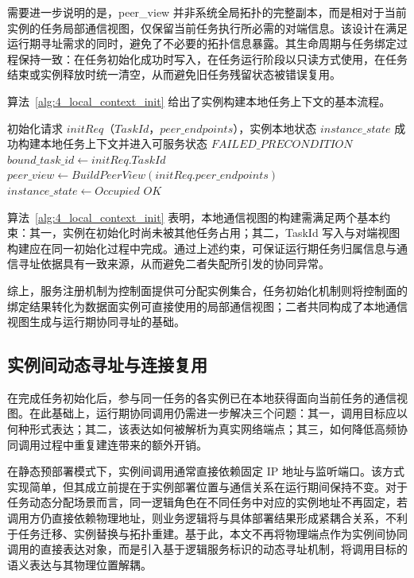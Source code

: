 \documentclass[lang=chs, degree=master, blindreview=true, winfonts=true, academic=false]{yanputhesis}
\begin{document}
需要进一步说明的是，peer\_view 并非系统全局拓扑的完整副本，而是相对于当前实例的任务局部通信视图，仅保留当前任务执行所必需的对端信息。该设计在满足运行期寻址需求的同时，避免了不必要的拓扑信息暴露。其生命周期与任务绑定过程保持一致：在任务初始化成功时写入，在任务运行阶段以只读方式使用，在任务结束或实例释放时统一清空，从而避免旧任务残留状态被错误复用。

算法~\ref{alg:4_local_context_init} 给出了实例构建本地任务上下文的基本流程。
\begin{algorithm}[htbp]
    \caption{实例本地任务上下文构建流程}
    \label{alg:4_local_context_init}
    \begin{algorithmic}[1]
        \Require 初始化请求 $initReq$（$TaskId$，$peer\_endpoints$），实例本地状态 $instance\_state$
        \Ensure 成功构建本地任务上下文并进入可服务状态
                \State \Return $FAILED\_PRECONDITION$
            \EndIf
            \State $bound\_task\_id \gets initReq.TaskId$
            \State $peer\_view \gets BuildPeerView(initReq.peer\_endpoints)$
            \State $instance\_state \gets Occupied$
            \State \Return $OK$
        \EndFunction
    \end{algorithmic}
\end{algorithm}

算法~\ref{alg:4_local_context_init} 表明，本地通信视图的构建需满足两个基本约束：其一，实例在初始化时尚未被其他任务占用；其二，TaskId 写入与对端视图构建应在同一初始化过程中完成。通过上述约束，可保证运行期任务归属信息与通信寻址依据具有一致来源，从而避免二者失配所引发的协同异常。

综上，服务注册机制为控制面提供可分配实例集合，任务初始化机制则将控制面的绑定结果转化为数据面实例可直接使用的局部通信视图；二者共同构成了本地通信视图生成与运行期协同寻址的基础。

\subsection{实例间动态寻址与连接复用}

在完成任务初始化后，参与同一任务的各实例已在本地获得面向当前任务的通信视图。在此基础上，运行期协同调用仍需进一步解决三个问题：其一，调用目标应以何种形式表达；其二，该表达如何被解析为真实网络端点；其三，如何降低高频协同调用过程中重复建连带来的额外开销。

在静态预部署模式下，实例间调用通常直接依赖固定 IP 地址与监听端口。该方式实现简单，但其成立前提在于实例部署位置与通信关系在运行期间保持不变。对于任务动态分配场景而言，同一逻辑角色在不同任务中对应的实例地址不再固定，若调用方仍直接依赖物理地址，则业务逻辑将与具体部署结果形成紧耦合关系，不利于任务迁移、实例替换与拓扑重建。基于此，本文不再将物理端点作为实例间协同调用的直接表达对象，而是引入基于逻辑服务标识的动态寻址机制，将调用目标的语义表达与其物理位置解耦。
\end{document}
